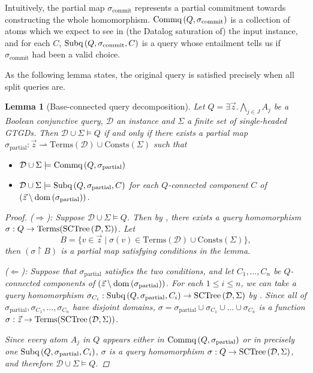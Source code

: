 \documentclass[12pt]{report}
\theoremstyle{plain}
\newtheorem{lemma}[theorem]{Lemma}
\theoremstyle{definition}
\def\Consts{{\mathrm{Consts}}}
\def\Terms{{\mathrm{Terms}}}
\newcommand{\dom}[1]{\ensuremath{\normalfont{\operatorname{dom}} \left( #1 \right)}}
\newcommand{\SCTree}[2]{\ensuremath{\normalfont{\textrm{SCTree}} \left( #1, #2 \right)}}
\newcommand{\Subq}[3]{\ensuremath{\normalfont{\textrm{Subq}} \left( #1, #2, #3 \right)}}
\newcommand{\Commq}[2]{\ensuremath{\normalfont{\textrm{Commq}} \left( #1, #2 \right)}}
\begin{document}
Intuitively, the partial map $\sigma_\mathrm{commit}$ represents a partial commitment towards constructing the whole homomorphism. $\Commq{Q}{\sigma_\mathrm{commit}}$ is a collection of atoms which we expect to see in (the Datalog saturation of) the input instance, and for each $C$, $\Subq{Q}{\sigma_\mathrm{commit}}{C}$ is a query whose entailment tells us if $\sigma_\mathrm{commit}$ had been a valid choice.

As the following lemma states, the original query is satisfied precisely when all split queries are.

\begin{lemma}[Base-connected query decomposition]
\label{bcq-base-connected-query-decomposition}
  Let $Q = \exists \vec{z}. \bigwedge_{j \in J} A_j$ be a Boolean conjunctive query, $\mathcal{D}$ an instance and $\Sigma$ a finite set of single-headed GTGDs. Then $\mathcal{D} \cup \Sigma \models Q$ if and only if there exists a partial map $\sigma_\mathrm{partial}: \vec{z} \rightharpoonup \Terms(\mathcal{D}) \cup \Consts(\Sigma)$ such that
  \begin{itemize}
    \item $\mathcal{D} \cup \Sigma \models \Commq{Q}{\sigma_\mathrm{partial}}$
    \item $\mathcal{D} \cup \Sigma \models \Subq{Q}{\sigma_\mathrm{partial}}{C}$ for each $Q$-connected component $C$ of \newline $(\vec{z} \setminus\nobreak \mathrm{\dom{\sigma_\mathrm{partial}}})$.
  \end{itemize}
  \begin{proof}
    ($\Longrightarrow$): Suppose $\mathcal{D} \cup \Sigma \models Q$. Then by , there exists a query homomorphism $\sigma: Q \rightarrow \Terms(\SCTree{\mathcal{D}}{\Sigma})$. Let $$B = \{ v \in \vec{z} \mid \sigma(v) \in \Terms(\mathcal{D}) \cup \Consts(\Sigma) \},$$ then $(\sigma \upharpoonright B)$ is a partial map satisfying conditions in the lemma.

    ($\Longleftarrow$): Suppose that $\sigma_\mathrm{partial}$ satisfies the two conditions, and let $C_1, \ldots, C_n$ be $Q$-connected components of $(\vec{z} \setminus\nobreak \mathrm{\dom{\sigma_\mathrm{partial}}})$. For each $1 \leq i \leq n$, we can take a query homomorphism $\sigma_{C_i}: \Subq{Q}{\sigma_\mathrm{partial}}{C_i} \rightarrow \SCTree{\mathcal{D}}{\Sigma}$ by . Since all of $\sigma_\mathrm{partial}, \sigma_{C_1}, \ldots, \sigma_{C_n}$ have disjoint domains, $\sigma = \sigma_\mathrm{partial} \cup \sigma_{C_1} \cup \ldots \cup \sigma_{C_n}$ is a function $\sigma: \vec{z} \rightarrow \Terms(\SCTree{\mathcal{D}}{\Sigma})$.
    
    Since every atom $A_j$ in $Q$ appears either in $\Commq{Q}{\sigma_\mathrm{partial}}$ or in precisely one $\Subq{Q}{\sigma_\mathrm{partial}}{C_i}$, $\sigma$ is a query homomorphism $\sigma: Q \rightarrow \SCTree{\mathcal{D}}{\Sigma}$, and therefore $\mathcal{D} \cup \Sigma \models Q$.
  \end{proof}
\end{lemma}
\end{document}
